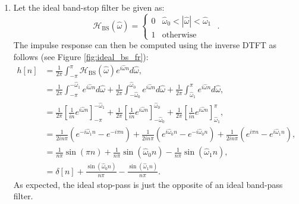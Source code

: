\begin{enumerate}
  \item Let the ideal band-stop filter be given as:
        \begin{equation*}
          \mathcal{H}_{\mathrm{BS}}(\hat{\omega}) = \left\{ \begin{array}{cc}
            0 & \hat{\omega}_0 < |\hat{\omega}| < \hat{\omega}_1 \\
            1 & \mathrm{otherwise}
          \end{array}\right.\,\,.
        \end{equation*}
        The impulse response can then be computed using the inverse DTFT as follows (see Figure \ref{fig:ideal_bs_fr}):
        \begin{align*}
          h[n] & =\frac{1}{2\pi}\int_{-\pi}^{\pi}\mathcal{H}_{\mathrm{BS}}(\hat{\omega})e^{i\hat{\omega}n}d\hat{\omega},                                                                                                                                                                        \\
               & =\frac{1}{2\pi}\int_{-\pi}^{-\hat{\omega}_{1}}e^{i\hat{\omega}n}d\hat{\omega} + \frac{1}{2\pi}\int_{-\hat{\omega}_{0}}^{\hat{\omega}_{0}}e^{i\hat{\omega}n}d\hat{\omega} + \frac{1}{2\pi}\int_{\hat{\omega}_{1}}^{\pi}e^{i\hat{\omega}n}d\hat{\omega},                         \\
               & =\frac{1}{2\pi}\left[\frac{1}{in}e^{i\hat{\omega}n}\right]_{-\pi}^{-\hat{\omega}_{1}} + \frac{1}{2\pi}\left[\frac{1}{in}e^{i\hat{\omega}n}\right]_{-\hat{\omega}_{0}}^{\hat{\omega}_{0}} + \frac{1}{2\pi}\left[\frac{1}{in}e^{i\hat{\omega}n}\right]_{\hat{\omega}_{1}}^{\pi}, \\
               & =\frac{1}{2in\pi}\left(e^{-i\hat{\omega}_{1}n}-e^{-i\pi n}\right) + \frac{1}{2in\pi}\left(e^{i\hat{\omega}_{0}n}-e^{-i\hat{\omega}_{0}n}\right) + \frac{1}{2in\pi}\left(e^{i\pi n}-e^{i\hat{\omega}_{1}n}\right),                                                              \\
               & =\frac{1}{n\pi}\sin(\pi n) + \frac{1}{n\pi}\sin(\hat{\omega}_{0}n) - \frac{1}{n\pi}\sin(\hat{\omega}_{1}n),                                                                                                                                                                    \\
               & =\delta[n] + \frac{\sin(\hat{\omega}_{0}n)}{n\pi} - \frac{\sin(\hat{\omega}_{1}n)}{n\pi}.
        \end{align*}
        As expected, the ideal stop-pass is just the opposite of an ideal band-pass filter.


\end{enumerate}

